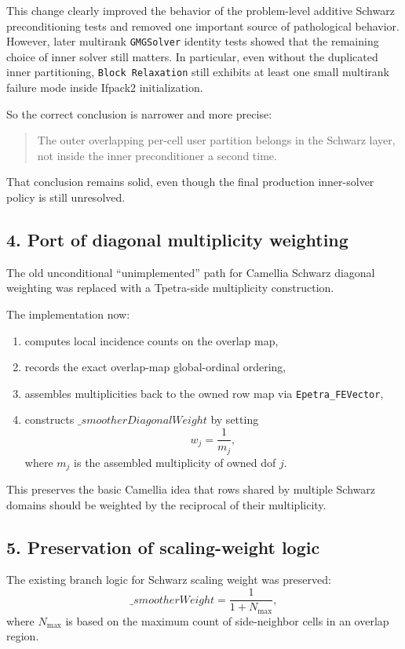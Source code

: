 \documentclass[11pt]{article}
\begin{document}
This change clearly improved the behavior of the problem-level additive Schwarz preconditioning tests and removed one important source of pathological behavior. However, later multirank \texttt{GMGSolver} identity tests showed that the remaining choice of inner solver still matters. In particular, even without the duplicated inner partitioning, \texttt{Block Relaxation} still exhibits at least one small multirank failure mode inside Ifpack2 initialization.

So the correct conclusion is narrower and more precise:
\begin{quote}
The outer overlapping per-cell user partition belongs in the Schwarz layer, not inside the inner preconditioner a second time.
\end{quote}
That conclusion remains solid, even though the final production inner-solver policy is still unresolved.

\subsection{4. Port of diagonal multiplicity weighting}
The old unconditional ``unimplemented'' path for Camellia Schwarz diagonal weighting was replaced with a Tpetra-side multiplicity construction.

The implementation now:
\begin{enumerate}
  \item computes local incidence counts on the overlap map,
  \item records the exact overlap-map global-ordinal ordering,
  \item assembles multiplicities back to the owned row map via \texttt{Epetra\_FEVector},
  \item constructs \(\_smootherDiagonalWeight\) by setting
  \[
  w_j = \frac{1}{m_j},
  \]
  where \(m_j\) is the assembled multiplicity of owned dof \(j\).
\end{enumerate}

This preserves the basic Camellia idea that rows shared by multiple Schwarz domains should be weighted by the reciprocal of their multiplicity.

\subsection{5. Preservation of scaling-weight logic}
The existing branch logic for Schwarz scaling weight was preserved:
\[
\_smootherWeight = \frac{1}{1 + N_{\max}},
\]
where \(N_{\max}\) is based on the maximum count of side-neighbor cells in an overlap region.
\end{document}
